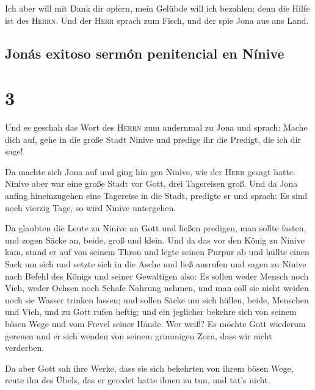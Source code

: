  Ich aber will mit Dank dir opfern, mein Gelübde will ich
bezahlen; denn die Hilfe ist des \textsc{Herrn}.  Und der
\textsc{Herr} sprach zum Fisch, und der spie Jona aus ans Land.

\hypertarget{jonuxe1s-exitoso-sermuxf3n-penitencial-en-nuxednive}{%
\subsection{Jonás exitoso sermón penitencial en
Nínive}\label{jonuxe1s-exitoso-sermuxf3n-penitencial-en-nuxednive}}

\hypertarget{section-2}{%
\section{3}\label{section-2}}

 Und es geschah das Wort des \textsc{Herrn} zum andernmal
zu Jona und sprach:  Mache dich auf, gehe in die große
Stadt Ninive und predige ihr die Predigt, die ich dir sage!

 Da machte sich Jona auf und ging hin gen Ninive, wie der
\textsc{Herr} gesagt hatte. Ninive aber war eine große Stadt vor Gott,
drei Tagereisen groß.  Und da Jona anfing hineinzugehen
eine Tagereise in die Stadt, predigte er und sprach: Es sind noch
vierzig Tage, so wird Ninive untergehen.

 Da glaubten die Leute zu Ninive an Gott und ließen
predigen, man sollte fasten, und zogen Säcke an, beide, groß und klein.
 Und da das vor den König zu Ninive kam, stand er auf von
seinem Thron und legte seinen Purpur ab und hüllte einen Sack um sich
und setzte sich in die Asche  und ließ ausrufen und sagen
zu Ninive nach Befehl des Königs und seiner Gewaltigen also: Es sollen
weder Mensch noch Vieh, weder Ochsen noch Schafe Nahrung nehmen, und man
soll sie nicht weiden noch sie Wasser trinken lassen;  und
sollen Säcke um sich hüllen, beide, Menschen und Vieh, und zu Gott rufen
heftig; und ein jeglicher bekehre sich von seinem bösen Wege und vom
Frevel seiner Hände.  Wer weiß? Es möchte Gott wiederum
gereuen und er sich wenden von seinem grimmigen Zorn, dass wir nicht
verderben.

 Da aber Gott sah ihre Werke, dass sie sich bekehrten von
ihrem bösen Wege, reute ihn des Übels, das er geredet hatte ihnen zu
tun, und tat's nicht.

